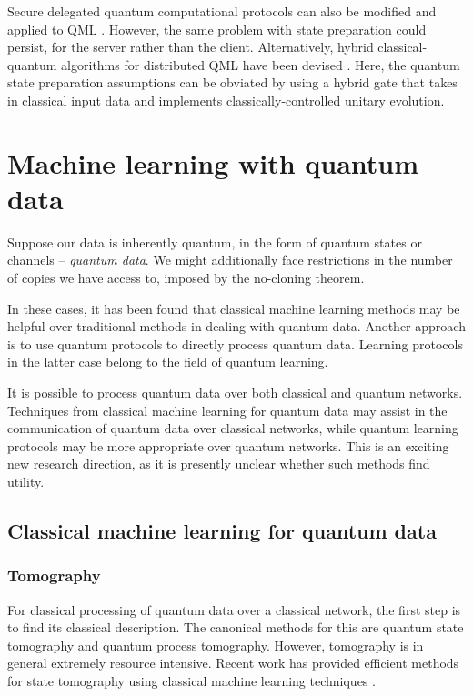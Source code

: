 \documentclass[twocolumn, aps, rmp, amsmath, amssymb, nofootinbib, superscriptaddress, longbibliography, floatfix, table-of-contents, eqsecnum]{revtex4}
\begin{document}
Secure delegated quantum computational protocols \cite{bib:joe} can also be modified and applied to QML \cite{bib:sheng2017distributed, bib:bang2015protocol}. However, the same problem with state preparation could persist, for the server rather than the client. Alternatively, hybrid classical-quantum algorithms for distributed QML have been devised \cite{bib:yoo2014quantum}. Here, the quantum state preparation assumptions can be obviated by using a hybrid gate that takes in classical input data and implements classically-controlled unitary evolution.

\section{Machine learning with quantum data} \label{sec:ml_quantum_data}

Suppose our data is inherently quantum, in the form of quantum states or channels -- \textit{quantum data}. We might additionally face restrictions in the number of copies we have access to, imposed by the no-cloning theorem.

In these cases, it has been found that classical machine learning methods may be helpful over traditional methods in dealing with quantum data. Another approach is to use quantum protocols to directly process quantum data. Learning protocols in the latter case belong to the field of quantum learning.

It is possible to process quantum data over both classical and quantum networks. Techniques from classical machine learning for quantum data may assist in the communication of quantum data over classical networks, while quantum learning protocols may be more appropriate over quantum networks. This is an exciting new research direction, as it is presently unclear whether such methods find utility.

\subsection{Classical machine learning for quantum data}

\subsubsection{Tomography}

For classical processing of quantum data over a classical network, the first step is to find its classical description. The canonical methods for this are quantum state tomography and quantum process tomography. However, tomography is in general extremely resource intensive. Recent work has provided efficient methods for state tomography using classical machine learning techniques \cite{bib:Torlai2017, bib:Han2017}.
\end{document}
